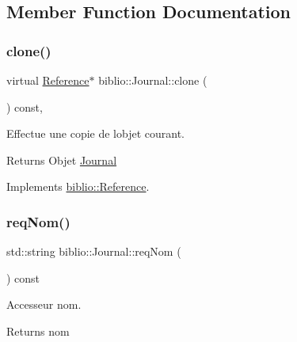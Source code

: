 \subsection{Member Function Documentation}
\mbox{\label{classbiblio_1_1Journal_a345f003e80ad8fdc9dd1a975b9139d4f}} 
\subsubsection{\texorpdfstring{clone()}{clone()}}
{\footnotesize\ttfamily virtual \hyperlink{classbiblio_1_1Reference}{Reference}$\ast$ biblio\+::\+Journal\+::clone (\begin{DoxyParamCaption}{ }\end{DoxyParamCaption}) const\hspace{0.3cm}{\ttfamily [inline]}, {\ttfamily [virtual]}}



Effectue une copie de l\textquotesingle{}objet courant. 

\begin{DoxyReturn}{Returns}
Objet \hyperlink{classbiblio_1_1Journal}{Journal} 
\end{DoxyReturn}


Implements \hyperlink{classbiblio_1_1Reference}{biblio\+::\+Reference}.

\mbox{\label{classbiblio_1_1Journal_aa139f1044819c85541473ec36a9fa311}} 
\subsubsection{\texorpdfstring{req\+Nom()}{reqNom()}}
{\footnotesize\ttfamily std\+::string biblio\+::\+Journal\+::req\+Nom (\begin{DoxyParamCaption}{ }\end{DoxyParamCaption}) const\hspace{0.3cm}{\ttfamily [inline]}}



Accesseur nom. 

\begin{DoxyReturn}{Returns}
nom 
\end{DoxyReturn}
\mbox{\label{classbiblio_1_1Journal_a28a30747554b750a73a2e244d7df362c}} 
